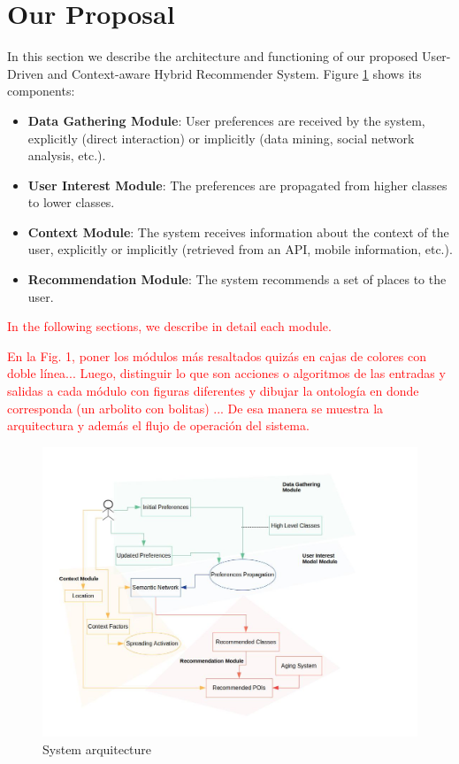 \section{Our Proposal}
\label{sec:proposal}

In this section we describe the architecture and functioning of our proposed User-Driven and Context-aware Hybrid Recommender System. Figure \ref{fig:arquitecture} shows its components:
\begin{itemize}
    \item \textbf{Data Gathering Module}: User preferences are received by the system, explicitly (direct interaction) or implicitly (data mining, social network analysis, etc.).
    \item \textbf{User Interest Module}: The preferences are propagated from higher classes to lower classes.
    \item \textbf{Context Module}: The system receives information about the context of the user, explicitly or implicitly (retrieved from an API, mobile information, etc.).
    \item \textbf{Recommendation Module}: The system recommends a set of places to the user.
\end{itemize}

\textcolor{red}{In the following sections, we describe in detail each module.}

\textcolor{red}{En la Fig. 1, poner los módulos más resaltados quizás en cajas de colores con doble línea... Luego, distinguir lo que son acciones o algoritmos de las entradas y salidas a cada módulo con figuras diferentes y dibujar la ontología en donde corresponda (un arbolito con bolitas) ... De esa manera se muestra la arquitectura y además el flujo de operación del sistema. }

\begin{figure}[h]
\centering
\includegraphics[scale=0.4]{draws/arquitecture.jpg}
\caption{System arquitecture}
\label{fig:arquitecture}
\end{figure}


